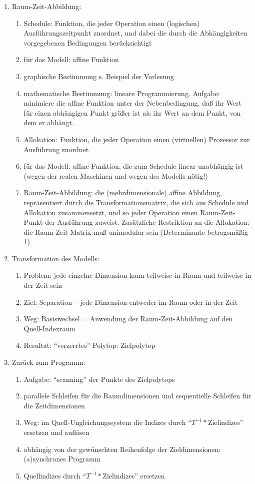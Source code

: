 \begin{enumerate}
%
\item Raum-Zeit-Abbildung:
\begin{enumerate}
\item Schedule: Funktion, die jeder Operation einen (logischen)
  Ausführungszeitpunkt zuordnet, und dabei die durch die Abhängigkeiten
  vorgegebenen Bedingungen berücksichtigt
\item für das Modell: affine Funktion
\item graphische Bestimmung s. Beispiel der Vorlesung
\item mathematische Bestimmung: lineare Programmierung. Aufgabe:
  minimiere die affine Funktion unter der Nebenbedingung, daß ihr Wert
  für einen abhängigen Punkt größer ist als ihr Wert an dem Punkt, von
  dem er abhängt.
\item Allokation: Funktion, die jeder Operation einen (virtuellen)
  Prozessor zur Ausführung zuordnet
\item für das Modell: affine Funktion, die zum Schedule linear
  unabhängig ist (wegen der realen Maschinen und wegen des Modells
  nötig!)
\item Raum-Zeit-Abbildung: die (mehrdimensionale) affine Abbildung,
  repräsentiert durch die Transformationsmatrix, die sich aus Schedule
  und Allokation zusammensetzt, und so jeder Operation einen
  Raum-Zeit-Punkt der Ausführung zuweist. Zusätzliche Restriktion an die
  Allokation: die Raum-Zeit-Matrix muß unimodular sein (Determinante
  betragsmäßig 1)
\end{enumerate}
%
\item Transformation des Modells:
\begin{enumerate}
\item Problem: jede einzelne Dimension kann teilweise in Raum und
  teilweise in der Zeit sein
\item Ziel: Separation -- jede Dimension entweder im Raum oder in der Zeit
\item Weg: Basiswechsel = Anwendung der Raum-Zeit-Abbildung auf den
  Quell-Indexraum
\item Resultat: ``verzerrtes'' Polytop: Zielpolytop
\end{enumerate}
%
\item Zurück zum Programm:
\begin{enumerate}
\item Aufgabe: ``scanning'' der Punkte des Zielpolytops
\item parallele Schleifen für die Raumdimensionen und sequentielle
  Schleifen für die Zeitdimensionen
\item Weg: im Quell-Ungleichungssystem die Indizes durch
  ``$T^{-1}*$Zielindizes'' ersetzen und auflösen
\item abhängig von der gewünschten Reihenfolge der Zieldimensionen:
  (a)synchrones Programm
\item Quellindizes durch ``$T^{-1}*$Zielindizes'' ersetzen
\end{enumerate}
\end{enumerate}

